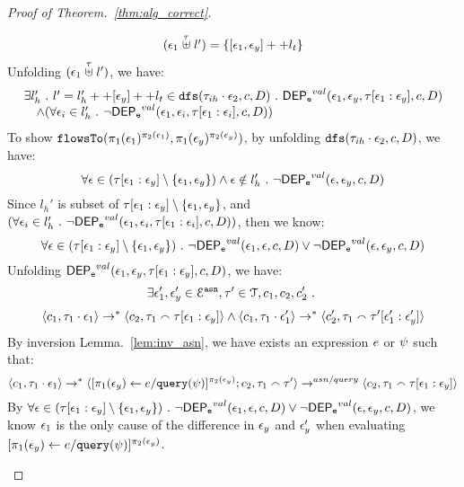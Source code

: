 \begin{proof}[Proof of Theorem.~\ref{thm:alg_correct}]
\begin{case}
\begin{subcase}
\begin{subsubcase}
\[
\begin{array}{l}
   (\mathtt{\epsilon}_1 \stackrel{\mathtt{\tau}}{\uplus} l') = \{[\mathtt{\epsilon}_1, \mathtt{\epsilon}_y] ++ l_t\}
\end{array}
\]
%
Unfolding $(\mathtt{\epsilon}_1 \stackrel{\mathtt{\tau}}{\uplus} l') $, we have:
\[
\begin{array}{l}
  \exists l_{h}' ~.~ l' = l_{h}' ++ [\mathtt{\epsilon}_y] ++ l_t \in \mathtt{dfs}(\mathtt{\tau}_{ih}\cdot \mathtt{\epsilon}_2, c, D) ~.~
  \mathsf{DEP_{\mathtt{e}}}^{val}(\mathtt{\epsilon}_1, \mathtt{\epsilon}_y, \mathtt{\tau}[\mathtt{\epsilon}_1:\mathtt{\epsilon}_y], c, D)
  \\ \quad \land 
  (\forall \mathtt{\epsilon}_i \in l_{h}' ~.~ \neg \mathsf{DEP_{\mathtt{e}}}^{val} (\mathtt{\epsilon}_1, \mathtt{\epsilon}_i, \mathtt{\tau}[\mathtt{\epsilon}_1: \mathtt{\epsilon}_i], c, D))
\end{array}
\]
%
%
To show $\mathtt{flowsTo}(\pi_1(\mathtt{\epsilon}_1)^{\pi_2(\mathtt{\epsilon}_1)}, \pi_1(\mathtt{\epsilon}_y)^{\pi_2(\mathtt{\epsilon}_y)})$, 
%
by unfolding $\mathtt{dfs}(\mathtt{\tau}_{ih}\cdot \mathtt{\epsilon}_2, c, D) $, we have:
\[
  \forall \mathtt{\epsilon} \in (\mathtt{\tau}[\mathtt{\epsilon}_1:\mathtt{\epsilon}_y]\setminus \{\mathtt{\epsilon}_1, \mathtt{\epsilon}_y\}) 
 \land \mathtt{\epsilon} \notin l_h' 
 ~.~ 
 \neg \mathsf{DEP_{\mathtt{e}}}^{val} (\mathtt{\epsilon}, \mathtt{\epsilon}_y, c, D)
\]
%
Since $l_{h}'$ is subset of $\mathtt{\tau}[\mathtt{\epsilon}_1:\mathtt{\epsilon}_y] \setminus \{\mathtt{\epsilon}_1, \mathtt{\epsilon}_y\}$, and $(\forall \mathtt{\epsilon}_i \in l_{h}' ~.~ \neg \mathsf{DEP_{\mathtt{e}}}^{val} (\mathtt{\epsilon}_1, \mathtt{\epsilon}_i, \mathtt{\tau}[\mathtt{\epsilon}_1: \mathtt{\epsilon}_i], c, D))$,
then we know:
\[
  \forall \mathtt{\epsilon} \in (\mathtt{\tau}[\mathtt{\epsilon}_1:\mathtt{\epsilon}_y]\setminus \{\mathtt{\epsilon}_1, \mathtt{\epsilon}_y\}) ~.~
  \neg \mathsf{DEP_{\mathtt{e}}}^{val} (\mathtt{\epsilon}_1, \mathtt{\epsilon}, c, D) \lor \neg \mathsf{DEP_{\mathtt{e}}}^{val} (\mathtt{\epsilon}, \mathtt{\epsilon}_y, c, D)
\]
%
Unfolding $\mathsf{DEP_{\mathtt{e}}}^{val}(\mathtt{\epsilon}_1, \mathtt{\epsilon}_y, \mathtt{\tau}[\mathtt{\epsilon}_1:\mathtt{\epsilon}_y], c, D)$, we have:
\[
  \exists \mathtt{\epsilon}_1', \mathtt{\epsilon}_y' \in \mathcal{E}^{\mathtt{{asn}}},
  \mathtt{\tau}' \in \mathcal{T}, c_1, c_2, c_2' ~.~
\]
%
\[
\langle c_1, \mathtt{\tau}_1 \cdot \mathtt{\epsilon}_1 \rangle \rightarrow^{*} \langle c_2, \mathtt{\tau}_1 \smallfrown \mathtt{\tau}[\mathtt{\epsilon}_1:\mathtt{\epsilon}_y] \rangle 
\land
\langle c_1, \mathtt{\tau}_1 \cdot \mathtt{\epsilon}_1' \rangle \rightarrow^{*} \langle c_2', \mathtt{\tau}_1 \smallfrown \mathtt{\tau}'[\mathtt{\epsilon}_1':\mathtt{\epsilon}_y'] \rangle 
\]
%
%
By inversion Lemma.~\ref{lem:inv_asn}, we have exists an expression $e$ or $\psi$ such that:
\[
\langle c_1, \mathtt{\tau}_1 \cdot \mathtt{\epsilon}_1 \rangle \rightarrow^{*} \langle [\mathrel{ \pi_1(\mathtt{\epsilon}_y) \leftarrow e / {\tt query}(\psi) }]{}^{\pi_2(\mathtt{\epsilon}_y)};c_2, \mathtt{\tau}_1 \smallfrown \mathtt{\tau}' \rangle \rightarrow^{asn / query} \langle c_2, \mathtt{\tau}_1 \smallfrown \mathtt{\tau}[\mathtt{\epsilon}_1:\mathtt{\epsilon}_y] \rangle 
\]
%
By $\forall \mathtt{\epsilon} \in (\mathtt{\tau}[\mathtt{\epsilon}_1:\mathtt{\epsilon}_y]\setminus \{\mathtt{\epsilon}_1, \mathtt{\epsilon}_y\}) ~.~
  \neg \mathsf{DEP_{\mathtt{e}}}^{val} (\mathtt{\epsilon}_1, \mathtt{\epsilon}, c, D) \lor \neg \mathsf{DEP_{\mathtt{e}}}^{val} (\mathtt{\epsilon}, \mathtt{\epsilon}_y, c, D)$,
we know $\mathtt{\epsilon}_1$ is the only cause of the difference in $\mathtt{\epsilon}_y$ and $\mathtt{\epsilon}_y'$ when evaluating $[\mathrel{ \pi_1(\mathtt{\epsilon}_y) \leftarrow e / {\tt query}(\psi) }]{}^{\pi_2(\mathtt{\epsilon}_y)}$.

\end{subsubcase}
\end{subcase}
\end{case}
\end{proof}
